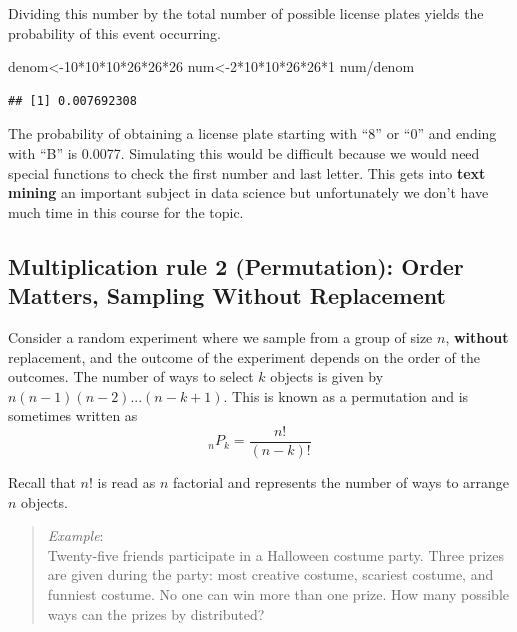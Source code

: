 \documentclass[
]{book}
\newenvironment{Shaded}{\begin{snugshade}}{\end{snugshade}}
\newcommand{\DecValTok}[1]{\textcolor[rgb]{0.00,0.00,0.81}{#1}}
\newcommand{\NormalTok}[1]{#1}
\newcommand{\OtherTok}[1]{\textcolor[rgb]{0.56,0.35,0.01}{#1}}
\newcommand{\SpecialCharTok}[1]{\textcolor[rgb]{0.00,0.00,0.00}{#1}}
\begin{document}
Dividing this number by the total number of possible license plates yields the probability of this event occurring.

\begin{Shaded}
\begin{Highlighting}[]
\NormalTok{denom}\OtherTok{\textless{}{-}}\DecValTok{10}\SpecialCharTok{*}\DecValTok{10}\SpecialCharTok{*}\DecValTok{10}\SpecialCharTok{*}\DecValTok{26}\SpecialCharTok{*}\DecValTok{26}\SpecialCharTok{*}\DecValTok{26}
\NormalTok{num}\OtherTok{\textless{}{-}}\DecValTok{2}\SpecialCharTok{*}\DecValTok{10}\SpecialCharTok{*}\DecValTok{10}\SpecialCharTok{*}\DecValTok{26}\SpecialCharTok{*}\DecValTok{26}\SpecialCharTok{*}\DecValTok{1}
\NormalTok{num}\SpecialCharTok{/}\NormalTok{denom}
\end{Highlighting}
\end{Shaded}

\begin{verbatim}
## [1] 0.007692308
\end{verbatim}

The probability of obtaining a license plate starting with ``8'' or ``0'' and ending with ``B'' is 0.0077. Simulating this would be difficult because we would need special functions to check the first number and last letter. This gets into \textbf{text mining} an important subject in data science but unfortunately we don't have much time in this course for the topic.

\hypertarget{multiplication-rule-2-permutation-order-matters-sampling-without-replacement}{%
\subsection{Multiplication rule 2 (Permutation): Order Matters, Sampling Without Replacement}\label{multiplication-rule-2-permutation-order-matters-sampling-without-replacement}}

Consider a random experiment where we sample from a group of size \(n\), \textbf{without} replacement, and the outcome of the experiment depends on the order of the outcomes. The number of ways to select \(k\) objects is given by \(n(n-1)(n-2)...(n-k+1)\). This is known as a permutation and is sometimes written as
\[
{}_nP_{k} = \frac{n!}{(n-k)!}
\]

Recall that \(n!\) is read as \(n\) factorial and represents the number of ways to arrange \(n\) objects.

\begin{quote}
\emph{Example}:\\
Twenty-five friends participate in a Halloween costume party. Three prizes are given during the party: most creative costume, scariest costume, and funniest costume. No one can win more than one prize. How many possible ways can the prizes by distributed?
\end{quote}
\end{document}
